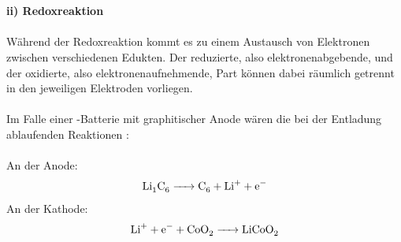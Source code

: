 \documentclass[a4paper, 11pt, headsepline,footsepline,twoside,abstract]{scrbook}
\begin{document}
\\\\
\textbf{ii) Redoxreaktion}
\\\\
Während der Redoxreaktion kommt es zu einem Austausch von Elektronen zwischen verschiedenen Edukten. Der reduzierte, also elektronenabgebende, und der oxidierte, also elektronenaufnehmende, Part können dabei räumlich getrennt in den jeweiligen Elektroden vorliegen.
\\\\
Im Falle einer -Batterie mit graphitischer Anode wären die bei der Entladung ablaufenden Reaktionen \cite{minakshi2008book}:
\\\\
An der Anode:\\ %
\begin{equation}
	\ce{Li1C6 -> C6 + Li+ + e-}
\end{equation}
An der Kathode:\\ %
\begin{equation}
	\ce{Li+ + e- + CoO2 -> LiCoO2}
\end{equation}
\end{document}
